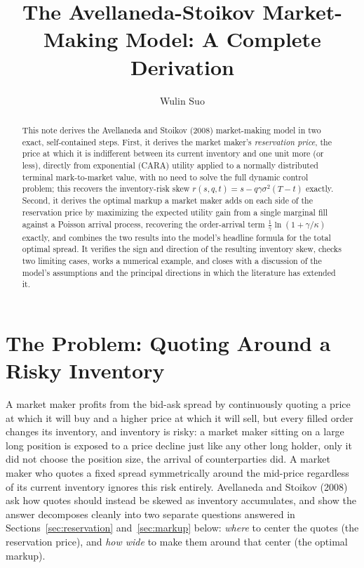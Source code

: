 \documentclass[11pt]{article}
\title{The Avellaneda-Stoikov Market-Making Model: A Complete Derivation}
\author{Wulin Suo}
\date{}
\theoremstyle{remark}
\theoremstyle{definition}
\begin{document}
\maketitle

\begin{abstract}
\noindent This note derives the Avellaneda and Stoikov (2008) market-making model in two exact, self-contained steps. First, it derives the market maker's \emph{reservation price}, the price at which it is indifferent between its current inventory and one unit more (or less), directly from exponential (CARA) utility applied to a normally distributed terminal mark-to-market value, with no need to solve the full dynamic control problem; this recovers the inventory-risk skew $r(s,q,t)=s-q\gamma\sigma^2(T-t)$ exactly. Second, it derives the optimal markup a market maker adds on each side of the reservation price by maximizing the expected utility gain from a single marginal fill against a Poisson arrival process, recovering the order-arrival term $\tfrac1\gamma\ln(1+\gamma/\kappa)$ exactly, and combines the two results into the model's headline formula for the total optimal spread. It verifies the sign and direction of the resulting inventory skew, checks two limiting cases, works a numerical example, and closes with a discussion of the model's assumptions and the principal directions in which the literature has extended it.
\end{abstract}

\section{The Problem: Quoting Around a Risky Inventory}
\label{sec:setup}

A market maker profits from the bid-ask spread by continuously quoting a price at which it will buy and a higher price at which it will sell, but every filled order changes its inventory, and inventory is risky: a market maker sitting on a large long position is exposed to a price decline just like any other long holder, only it did not choose the position size, the arrival of counterparties did. A market maker who quotes a fixed spread symmetrically around the mid-price regardless of its current inventory ignores this risk entirely. Avellaneda and Stoikov (2008) ask how quotes should instead be skewed as inventory accumulates, and show the answer decomposes cleanly into two separate questions answered in Sections~\ref{sec:reservation} and~\ref{sec:markup} below: \emph{where} to center the quotes (the reservation price), and \emph{how wide} to make them around that center (the optimal markup).
\end{document}
